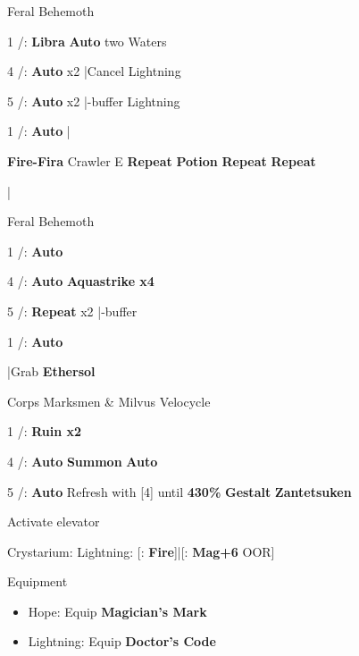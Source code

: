 \begin{fight}{Feral Behemoth}
	\item [1] \rav/\com: \textbf{Libra} \to \textbf{Auto} two Waters
	\item [4] \rav/\rav: \textbf{Auto} x2 |Cancel Lightning
	\item [5] \rav/\rav: \textbf{Auto} x2 |\com-buffer Lightning
	\item [1] \rav/\com: \textbf{Auto} |\skip
\end{fight}
\begin{mainlist}
	\item {} \textbf{Fire-Fira} Crawler E \to [6] \textbf{Repeat} \to \textbf{\textbf{Potion}} \to \textbf{Repeat} \to [1] \textbf{Repeat}
	\item {}|
\end{mainlist}
\begin{fight}{Feral Behemoth}
	\item [1] \com/\rav: \textbf{Auto}
	\item [4] \rav/\rav: \textbf{Auto} \to \textbf{Aquastrike x4}
	\item [5] \rav/\rav: \textbf{Repeat} x2 |\com-buffer
	\item [1] \com/\rav: \textbf{Auto}
\end{fight}
\begin{mainlist}
	\item \skip|Grab \textbf{Ethersol}
\end{mainlist}
\begin{fight}{Corps Marksmen \& Milvus Velocycle}
	\item [1] \com/\rav: \textbf{Ruin x2}
	\item [4] \rav/\rav: \textbf{Auto} \to \textbf{Summon} \to \textbf{Auto}
	\item [5] \rav/\rav: \textbf{Auto} \to Refresh with [4] until \textbf{430\%} \to \textbf{Gestalt} \to \textbf{Zantetsuken}
	\item Activate elevator
\end{fight}
\begin{menu}
	\item Crystarium: Lightning: [\rav: \textbf{Fire}]|[\com: \textbf{Mag+6} OOR]
	\item Equipment
	\begin{itemize}
		\item Hope: Equip \textbf{Magician's Mark}
		\item Lightning: Equip \textbf{Doctor's Code}
	\end{itemize}
\end{menu}
